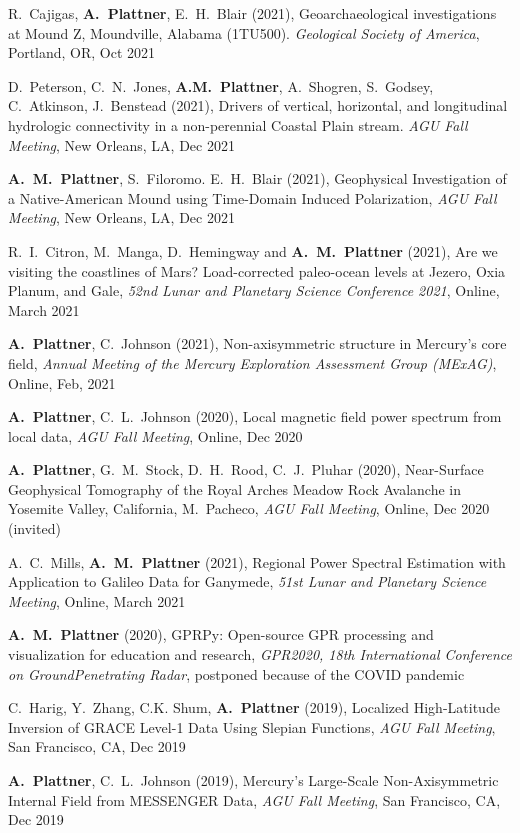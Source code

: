 \documentclass[10pt]{article}
\begin{document}
\spcp R.~Cajigas, \textbf{A.~Plattner}, E.~H.~Blair (2021),
Geoarchaeological investigations at Mound Z, Moundville, Alabama
(1TU500). \emph{Geological Society of America}, Portland, OR, Oct 2021

\spcp D.~Peterson, C.~N.~Jones, \textbf{A.M.~Plattner}, A.~Shogren,
S.~Godsey, C.~Atkinson, J.~Benstead (2021), Drivers of vertical,
horizontal, and longitudinal hydrologic connectivity in a
non-perennial Coastal Plain stream. \emph{AGU Fall Meeting}, New
Orleans, LA, Dec 2021

\spcp \textbf{A.~M.~Plattner}, S.~Filoromo. E.~H.~Blair (2021),
Geophysical Investigation of a Native-American Mound using Time-Domain
Induced Polarization, \emph{AGU Fall Meeting}, New Orleans, LA, Dec
2021

\spcp R.~I.~Citron, M.~Manga, D.~Hemingway and \textbf{A.~M.~Plattner}
(2021), Are we visiting the coastlines of Mars? Load-corrected
paleo-ocean levels at Jezero, Oxia Planum, and Gale, \emph{52nd Lunar
and Planetary Science Conference 2021}, Online, March 2021

\spcp \textbf{A.~Plattner}, C.~Johnson (2021), Non-axisymmetric
structure in Mercury's core field, \emph{Annual Meeting of the Mercury
Exploration Assessment Group (MExAG)}, Online, Feb, 2021

\spcp \textbf{A.~Plattner}, C.~L.~Johnson (2020),
Local magnetic field power spectrum from local data,
\emph{AGU Fall Meeting}, Online, Dec 2020 

\spcp \textbf{A.~Plattner}, G.~M.~Stock, D.~H.~Rood, C.~J.~Pluhar
(2020), Near-Surface Geophysical Tomography of the Royal Arches Meadow
Rock Avalanche in Yosemite Valley, California, M.~Pacheco, \emph{AGU
Fall Meeting}, Online, Dec 2020 (invited)

\spcp A.~C.~Mills, \textbf{A.~M.~Plattner} (2021), Regional Power
Spectral Estimation with Application to Galileo Data for Ganymede,
\emph{51st Lunar and Planetary Science Meeting}, Online, March 2021

\spcp \textbf{A.~M.~Plattner} (2020), GPRPy: Open-source GPR processing
and visualization for education and research, \emph{GPR2020, 18th
International Conference on GroundPenetrating Radar}, postponed
because of the COVID pandemic

\spcp C.~Harig, Y.~Zhang, C.K. Shum, \textbf{A.~Plattner} (2019),
Localized High-Latitude Inversion of GRACE Level-1 Data Using Slepian Functions,
\emph{AGU Fall Meeting}, San Francisco, CA, Dec 2019

\spcp \textbf{A.~Plattner}, C.~L.~Johnson (2019), Mercury's
Large-Scale Non-Axisymmetric Internal Field from MESSENGER Data,
\emph{AGU Fall Meeting}, San Francisco, CA, Dec 2019
\end{document}
